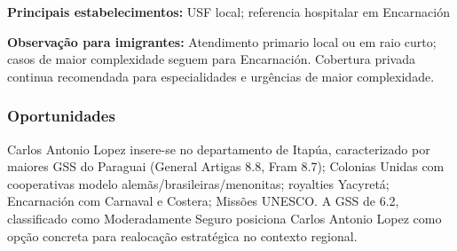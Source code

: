 \textbf{Principais estabelecimentos:} USF local; referencia hospitalar
em Encarnación

\textbf{Observação para imigrantes:} Atendimento primario local ou em
raio curto; casos de maior complexidade seguem para Encarnación.
Cobertura privada continua recomendada para especialidades e urgências
de maior complexidade.
\newpage

\subsubsection*{Oportunidades}\label{oport-carlos-antonio-lopez-0709}
Carlos Antonio Lopez insere-se no departamento de Itapúa, caracterizado por maiores GSS do Paraguai (General Artigas 8.8, Fram 8.7); Colonias Unidas com cooperativas modelo alemãs/brasileiras/menonitas; royalties Yacyretá; Encarnación com Carnaval e Costera; Missões UNESCO. A GSS de 6.2, classificado como Moderadamente Seguro posiciona Carlos Antonio Lopez como opção concreta para realocação estratégica no contexto regional.

